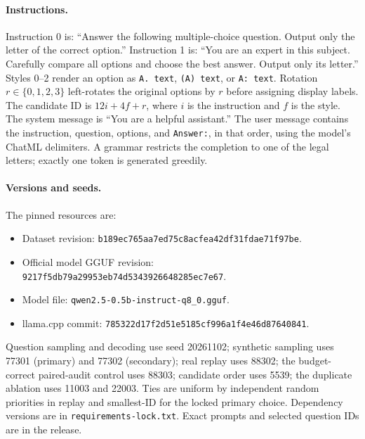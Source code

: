 \documentclass{article}
\begin{document}
\paragraph{Instructions.}
Instruction 0 is: ``Answer the following multiple-choice question. Output only the letter of the correct option.'' Instruction 1 is: ``You are an expert in this subject. Carefully compare all options and choose the best answer. Output only its letter.'' Styles 0--2 render an option as \texttt{A. text}, \texttt{(A) text}, or \texttt{A: text}. Rotation $r\in\{0,1,2,3\}$ left-rotates the original options by $r$ before assigning display labels. The candidate ID is $12i+4f+r$, where $i$ is the instruction and $f$ is the style. The system message is ``You are a helpful assistant.'' The user message contains the instruction, question, options, and \texttt{Answer:}, in that order, using the model's ChatML delimiters. A grammar restricts the completion to one of the legal letters; exactly one token is generated greedily.

\paragraph{Versions and seeds.}
The pinned resources are:
\begin{itemize}
\item Dataset revision: \texttt{b189ec765aa7ed75c8acfea42df31fdae71f97be}.
\item Official model GGUF revision: \texttt{9217f5db79a29953eb74d5343926648285ec7e67}.
\item Model file: \texttt{qwen2.5-0.5b-instruct-q8\_0.gguf}.
\item llama.cpp commit: \texttt{785322d17f2d51e5185cf996a1f4e46d87640841}.
\end{itemize}
Question sampling and decoding use seed 20261102; synthetic sampling uses 77301 (primary) and 77302 (secondary); real replay uses 88302; the budget-correct paired-audit control uses 88303; candidate order uses 5539; the duplicate ablation uses 11003 and 22003. Ties are uniform by independent random priorities in replay and smallest-ID for the locked primary choice. Dependency versions are in \texttt{requirements-lock.txt}. Exact prompts and selected question IDs are in the release.
\end{document}
